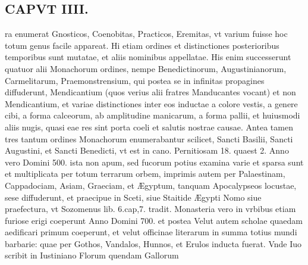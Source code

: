 \documentclass{article}
\begin{document}
\begin{pages}
\section*{CAPVT  IIII. }
\marginpar{[ p.219 ]}\pstart ra enumerat Gnosticos, Coenobitas, Practicos, Eremitas, vt varium fuisse hoc totum genus facile appareat. Hi etiam ordines et distinctiones posterioribus temporibus sunt mutatae, et aliis nominibus appellatae. His enim successerunt quatuor alii Monachorum ordines, nempe Benedictinorum, Augustinianorum, Carmelitarum, Praemonstrensium, qui postea se in infinitas propagines diffuderunt, Mendicantium (quos verius alii fratres Manducantes vocant) et non Mendicantium, et variae distinctiones inter eos inductae a colore vestis, a genere cibi, a forma calceorum, ab amplitudine manicarum, a forma pallii, et huiusmodi aliis nugis, quasi eae res sint porta coeli et salutis nostrae causae. Antea tamen tres tantum ordines Monachorum enumerabantur scilicet, Sancti Basilii, Sancti Augustini, et Sancti Benedicti, vt est in cano. Pernitiosam 18. quaest 2. Anno vero Domini 500. ista non apum, sed fucorum potius examina varie et sparsa sunt et multiplicata per totum terrarum orbem, imprimis autem per Palaestinam, Cappadociam, Asiam, Graeciam, et Ægyptum, tanquam Apocalypseos locustae, sese diffuderunt, et praecipue in Sceti, siue Staitide Ægypti Nomo siue praefectura, vt Sozomenus lib. 6.cap,7. tradit. Monasteria vero in vrbibus etiam furiose erigi coeperunt Anno Domini 700. et postea Velut autem scholae quaedam aedificari primum coeperunt, et velut officinae literarum in summa totius mundi barbarie: quae per Gothos, Vandalos, Hunnos, et Erulos inducta fuerat. Vnde Iuo scribit in Iustiniano Florum quendam Gallorum  \pend

\end{pages}
\end{document}
